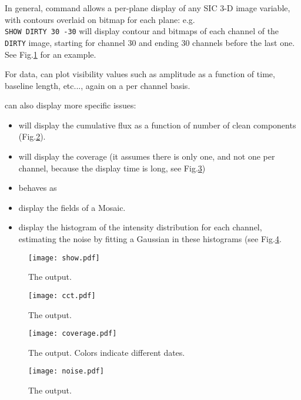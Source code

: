In general, command  allows a per-plane display of any SIC 
3-D image variable, with contours overlaid on bitmap for each plane: 
e.g.\\
\texttt{SHOW DIRTY 30 -30} 
will display contour and bitmaps of each channel of the \texttt{DIRTY}
image, starting for channel 30 and ending 30 channels before the last one.
See Fig.\ref{fig:show} for an example. 

For \uv{}  data,  can plot visibility values
such as amplitude as a function of time, baseline length, etc...,
again on a per channel basis. 

 can also display more specific issues:
\begin{itemize}\itemsep 0pt
\item {} will display the cumulative flux as a function 
of number of clean components (Fig.\ref{fig:cct}). 
\item {} will display the \uv{} coverage (it
assumes there is only one, and not one per channel, because the
display time is long, see Fig.\ref{fig:coverage})
\item {} behaves as 
\item {} display the fields of a Mosaic.
\item {} display the histogram of the intensity
distribution for each channel, estimating the noise by fitting
a Gaussian in these histograms (see Fig.\ref{fig:noise}.
\end{itemize}

\begin{figure}
  \centering
  \texttt{[image: show.pdf]}
  \caption{The  output.
\label{fig:show}}
\end{figure}
\begin{figure}
  \centering
  \texttt{[image: cct.pdf]}
  \caption{The  output.
\label{fig:cct}}
\end{figure}
\begin{figure}
  \centering
  \texttt{[image: coverage.pdf]}
  \caption{The  output. Colors indicate
  different dates.
\label{fig:coverage}}
\end{figure}
\begin{figure}
  \centering
  \texttt{[image: noise.pdf]}
  \caption{The  output.
\label{fig:noise}}
\end{figure}

